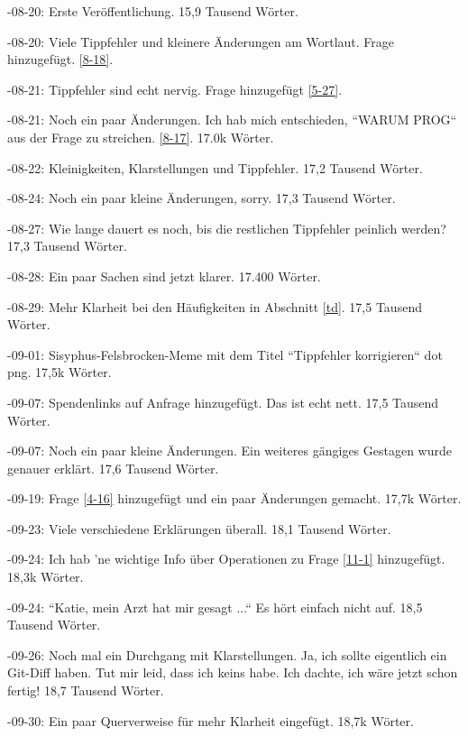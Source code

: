 \documentclass{article}
\begin{document}
-08-20: Erste Veröffentlichung. 15,9 Tausend Wörter.

-08-20: Viele Tippfehler und kleinere Änderungen am Wortlaut. Frage hinzugefügt. \ref{8-18}.

-08-21: Tippfehler sind echt nervig. Frage hinzugefügt \ref{5-27}.

-08-21: Noch ein paar Änderungen. Ich hab mich entschieden, “WARUM PROG“ aus der Frage zu streichen. \ref{8-17}. 17.0k Wörter.

-08-22: Kleinigkeiten, Klarstellungen und Tippfehler. 17,2 Tausend Wörter.

-08-24: Noch ein paar kleine Änderungen, sorry. 17,3 Tausend Wörter.

-08-27: Wie lange dauert es noch, bis die restlichen Tippfehler peinlich werden? 17,3 Tausend Wörter.

-08-28: Ein paar Sachen sind jetzt klarer. 17.400 Wörter.

-08-29: Mehr Klarheit bei den Häufigkeiten in Abschnitt \ref{td}. 17,5 Tausend Wörter.

-09-01: Sisyphus-Felsbrocken-Meme mit dem Titel “Tippfehler korrigieren“ dot png. 17,5k Wörter.

-09-07: Spendenlinks auf Anfrage hinzugefügt. Das ist echt nett. 17,5 Tausend Wörter.

-09-07: Noch ein paar kleine Änderungen. Ein weiteres gängiges Gestagen wurde genauer erklärt. 17,6 Tausend Wörter.

-09-19: Frage \ref{4-16} hinzugefügt und ein paar Änderungen gemacht. 17,7k Wörter.

-09-23: Viele verschiedene Erklärungen überall. 18,1 Tausend Wörter.

-09-24: Ich hab 'ne wichtige Info über Operationen zu Frage \ref{11-1} hinzugefügt. 18,3k Wörter.

-09-24: “Katie, mein Arzt hat mir gesagt ...“ Es hört einfach nicht auf. 18,5 Tausend Wörter.

-09-26: Noch mal ein Durchgang mit Klarstellungen. Ja, ich sollte eigentlich ein Git-Diff haben. Tut mir leid, dass ich keins habe. Ich dachte, ich wäre jetzt schon fertig! 18,7 Tausend Wörter.

-09-30: Ein paar Querverweise für mehr Klarheit eingefügt. 18,7k Wörter.
\end{document}
